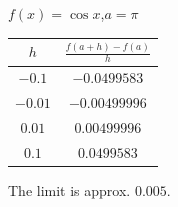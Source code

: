 {$\displaystyle f(x) =\cos x$,\quad  $a=\pi$}
{\begin{tabular}{cc}
$h$ & $\frac{f(a+h)-f(a)}{h}$\\ \hline 
 $-0.1$ & $-0.0499583$ \\
 $-0.01$ & $-0.00499996$ \\
 $0.01$ & $0.00499996$ \\
 $0.1$ & $0.0499583$
\end{tabular}

The limit is approx. $0.005$.
}
